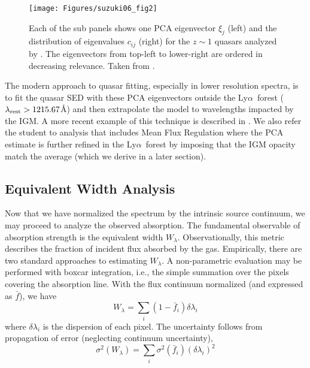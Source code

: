 \documentclass[graybox]{svmult}
\def\lya{Ly$\alpha$}
\def\smm{\sum\limits}
\begin{document}
%
\begin{figure}[b]
\sidecaption
\texttt{[image: Figures/suzuki06\_fig2]}
%
%
\caption{Each of the sub panels shows one PCA eigenvector 
$\xi_j$  (left) 
and the distribution of eigenvalues $c_{ij}$ (right) for the 
$z\sim 1$ quasars analyzed by \cite{suzuki06}.
The eigenvectors from top-left to lower-right are ordered
in decreasing relevance.
Taken from \cite{suzuki06}.
}
\label{fig:PCA}       %
\end{figure}

The modern approach to quasar fitting, especially in 
lower resolution spectra, is to fit the quasar SED
with these PCA eigenvectors outside the \lya\ forest
($\lambda_{\rm rest} > 1215.67$\AA) and then extrapolate
the model to wavelengths impacted by the IGM.
A more recent example of this technique is described
in \cite{paris11}.  We also refer the student to analysis
that includes Mean Flux Regulation \cite{lee+12} where the
PCA estimate is further refined in the \lya\ forest by
imposing that the IGM opacity match the average (which
we derive in a later section).

\subsection{Equivalent Width Analysis}

Now that we have normalized the spectrum by the
intrinsic source continuum, we may proceed to analyze
the observed absorption.  The fundamental observable
of absorption strength is the equivalent width $W_\lambda$.
Observationally, this metric describes the fraction of
incident flux absorbed by the gas.  Empirically, there
are two standard approaches to estimating $W_\lambda$.
A non-parametric evaluation may be performed with
boxcar integration, i.e.,
the simple summation over the pixels covering the absorption line.
With the flux continuum normalized  (and expressed as $\bar f$),
we have
\begin{equation}
W_\lambda = \smm_i (1- \bar f_i) \delta\lambda_i
\label{eqn:EWtwo}
\end{equation}
where $\delta\lambda_i$ is the dispersion of each pixel.
The uncertainty follows from propagation of error (neglecting
continuum uncertainty),
\begin{equation}
\sigma^2(W_\lambda) = \smm_i \sigma^2(\bar f_i) (\delta\lambda_i)^2
\label{eqn:sigEW}
\end{equation}
\end{document}
